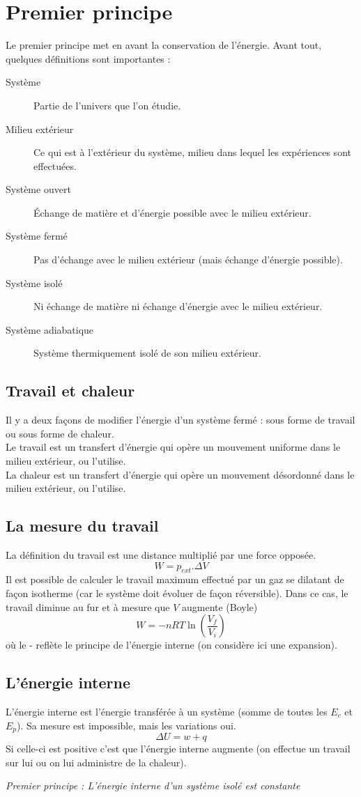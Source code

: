 \documentclass[british,french,11pt, a4paper, openany]{book}
\begin{document}
\section{Premier principe}
Le premier principe met en avant la conservation de l'énergie. Avant tout, quelques définitions sont importantes : 
\begin{description}
	\item[Système] Partie de l'univers que l'on étudie.
	\item[Milieu extérieur] Ce qui est à l'extérieur du système, milieu dans lequel les expériences sont effectuées.
	\item[Système ouvert] Échange de matière et d'énergie possible avec le milieu extérieur.
	\item[Système fermé] Pas d'échange avec le milieu extérieur (mais échange d'énergie possible).
	\item[Système isolé] Ni échange de matière ni échange d'énergie avec le milieu extérieur.
	\item[Système adiabatique] Système thermiquement isolé de son milieu extérieur.
\end{description}
\subsection{Travail et chaleur}
Il y a deux façons de modifier l'énergie d'un système fermé : sous forme de travail ou sous forme de chaleur.\\
Le travail est un transfert d'énergie qui opère un mouvement uniforme dans le milieu extérieur, ou l'utilise.\\
La chaleur est un transfert d'énergie qui opère un mouvement désordonné dans le milieu extérieur, ou l'utilise.

\subsection{La mesure du travail}
La définition du travail est une distance multiplié par une force opposée.
$$W = p_{ext}.\Delta V$$
Il est possible de calculer le travail maximum effectué par un gaz se dilatant de façon isotherme (car le système doit évoluer de façon réversible). Dans ce cas, le travail diminue au fur et à mesure que $V$ augmente (Boyle)
$$W = -nRT\ln\left(\frac{V_f}{V_i}\right)$$
où le - reflète le principe de l'énergie interne (on considère ici une expansion).

\subsection{L'énergie interne}
L'énergie interne est l'énergie transférée à un système (somme de toutes les $E_c$ et $E_p$). Sa mesure est impossible, mais les variations oui.
$$\Delta U = w + q$$
Si celle-ci est positive c'est que l'énergie interne augmente (on effectue un travail sur lui ou on lui administre de la chaleur).
\begin{center}
	\textit{Premier principe : L'énergie interne d'un système isolé est constante}
\end{center}
\end{document}

